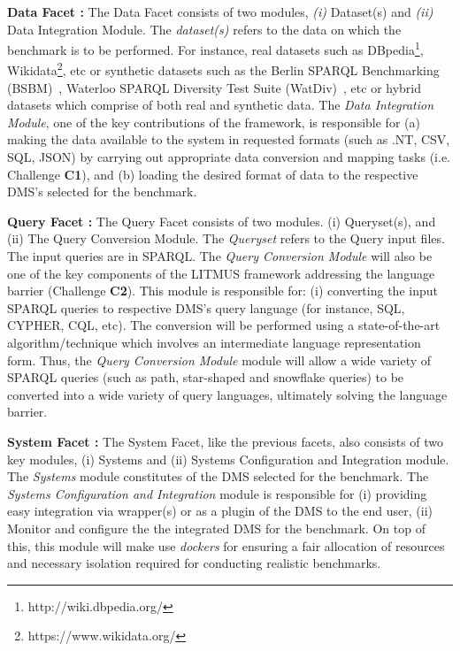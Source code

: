\documentclass{llncs}
\begin{document}
\begin{itemize}
        \textbf{Data Facet :} The Data Facet consists of two modules, \textit{(i)} Dataset(s) and \textit{(ii)} Data Integration Module. The \textit{dataset(s)} refers to the data on which the benchmark is to be performed. For instance, real datasets such as DBpedia\footnote{http://wiki.dbpedia.org/}, Wikidata\footnote{https://www.wikidata.org/}, etc or synthetic datasets such as the Berlin SPARQL Benchmarking (BSBM)~\cite{bizer2008benchmarking,bizer2009berlin}, Waterloo SPARQL Diversity Test Suite (WatDiv)~\cite{alucc2014diversified}, etc or hybrid datasets which comprise of both real and synthetic data. 
        The \textit{Data Integration Module}, one of the key contributions of the framework, is responsible for (a) making the data available to the system in requested formats (such as .NT, CSV, SQL, JSON) by carrying out appropriate data conversion and mapping tasks (i.e. Challenge \textbf{C1}), and (b) loading the desired format of data to the respective DMS's selected for the benchmark. 
        
        \textbf{Query Facet :} The Query Facet consists of two modules. (i) Queryset(s), and (ii) The Query Conversion Module. The \textit{Queryset} refers to the Query input files. The input queries are in SPARQL. The \textit{Query Conversion Module} will also be one of the key components of the LITMUS framework addressing the language barrier (Challenge \textbf{C2}). This module is responsible for: (i) converting the input SPARQL queries to respective DMS's query language (for instance, SQL, CYPHER, CQL, etc). The conversion will be performed using a state-of-the-art algorithm/technique which involves an intermediate language representation form. Thus, the \textit{Query Conversion Module} module will allow a wide variety of SPARQL queries (such as path, star-shaped and snowflake queries) to be converted into a wide variety of query languages, ultimately solving the language barrier.
        
        \textbf{System Facet :} The System Facet, like the previous facets, also consists of two key modules, (i) Systems and (ii) Systems Configuration and Integration module. The \textit{Systems} module  constitutes of the DMS selected for the benchmark. The \textit{ Systems Configuration and Integration} module is responsible for (i) providing easy integration via wrapper(s) or as a plugin of the DMS to the end user, (ii) Monitor and configure the the integrated DMS for the benchmark. On top of this, this module will make use \textit{dockers} for ensuring a fair allocation of resources and necessary isolation required for conducting realistic benchmarks. 
        

\end{itemize}
\end{document}
